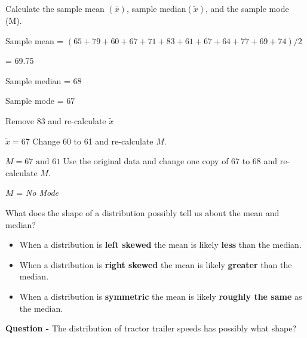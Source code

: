 \documentclass{report}
\begin{document}
\bigbreak \noindent \bigbreak \noindent
{}
\bigbreak \noindent
{} Calculate the sample mean $(\bar{x})$, sample median$(\tilde{x})$, and the sample mode (M).
\bigbreak \noindent

Sample mean =  $(65+79+60+67+71+83+61+67+64+77+69+74) / 2 $ 
\vspace{1.5mm}

\centerline{ = 69.75}
\vspace{2mm}

Sample median = $68$
\vspace{4mm}

Sample mode = $67$
\vspace{5mm}

\noindent{} Remove 83 and re-calculate $\tilde{x}$
\vspace{3mm}

$\tilde{x} = 67$
\bigbreak \noindent
\noindent{} Change 60 to 61 and re-calculate $M$.
\vspace{3mm}

$M = 67 \text{ and } 61$
\bigbreak \noindent
{} Use the original data and change one copy of 67 to 68 and re-calculate $M$.
\vspace{2mm}

$M$ = \textit{No Mode}

\bigbreak \noindent \bigbreak \noindent
  What does the shape of a distribution possibly tell us about the mean and median? 
  \vspace{1.5mm}

    \begin{itemize}
      \item When a distribution is \textbf{left skewed} the mean is likely \textbf{less} than the median. 
      \item When a distribution is \textbf{right skewed} the mean is likely \textbf{greater} than the median. 
      \item When a distribution is \textbf{symmetric} the mean is likely \textbf{roughly the same} as the median.
\end{itemize}
\bigbreak \noindent \bigbreak \noindent
\textbf{Question - } The distribution of tractor trailer speeds has possibly what shape?
\vspace{3mm}
\end{document}
